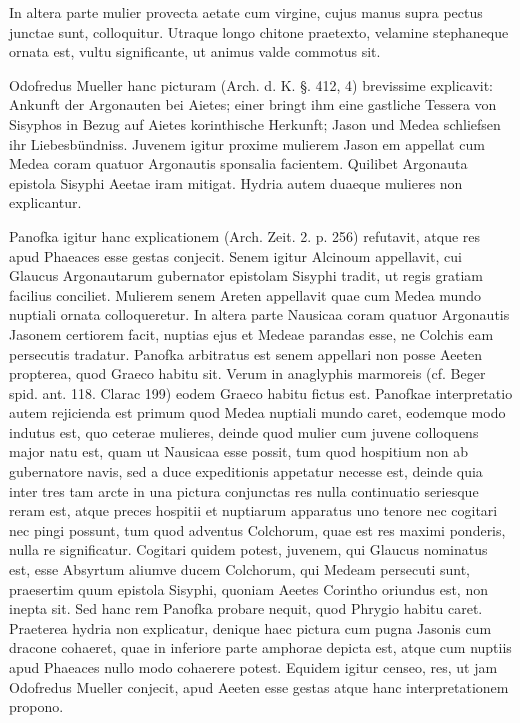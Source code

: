 \documentclass[landscape, a4paper, 11pt, oneside, polutonikogreek, german]{article}
\begin{document}
In altera parte mulier provecta aetate cum virgine, cujus manus supra pectus junctae sunt, colloquitur. Utraque longo chitone praetexto, velamine stephaneque ornata est, vultu significante, ut animus valde commotus sit.

Odofredus Mueller hanc picturam (Arch. d. K. §. 412, 4) brevissime explicavit: Ankunft der Argonauten bei Aietes; einer bringt ihm eine gastliche Tessera von Sisyphos in Bezug auf Aietes korinthische Herkunft; Jason und Medea schliefsen ihr Liebesbündniss. Juvenem igitur proxime mulierem Jason em appellat cum Medea coram quatuor Argonautis sponsalia facientem. Quilibet Argonauta epistola Sisyphi Aeetae iram mitigat. Hydria autem duaeque mulieres non explicantur.

Panofka igitur hanc explicationem (Arch. Zeit. 2. p. 256) refutavit, atque res apud Phaeaces esse gestas conjecit. Senem igitur Alcinoum appellavit, cui Glaucus Argonautarum gubernator epistolam Sisyphi tradit, ut regis gratiam facilius conciliet. Mulierem senem Areten appellavit quae cum Medea mundo nuptiali ornata colloqueretur. In altera parte Nausicaa coram quatuor Argonautis Jasonem certiorem facit, nuptias ejus et Medeae parandas esse, ne Colchis eam persecutis tradatur. Panofka arbitratus est senem appellari non posse Aeeten propterea, quod Graeco habitu sit. Verum in anaglyphis marmoreis (cf. Beger spid. ant. 118. Clarac 199) eodem Graeco habitu fictus est. Panofkae interpretatio autem rejicienda est primum quod Medea nuptiali mundo caret, eodemque modo indutus est, quo ceterae mulieres, deinde quod mulier cum juvene colloquens major natu est, quam ut Nausicaa esse possit, tum quod hospitium non ab gubernatore navis, sed a duce expeditionis appetatur necesse est, deinde quia inter tres tam arcte in una pictura conjunctas res nulla continuatio seriesque reram est, atque preces hospitii et nuptiarum apparatus uno tenore nec cogitari nec pingi possunt, tum quod adventus Colchorum, quae est res maximi ponderis, nulla re significatur. Cogitari quidem potest, juvenem, qui Glaucus nominatus est, esse Absyrtum aliumve ducem Colchorum, qui Medeam persecuti sunt, praesertim quum epistola Sisyphi, quoniam Aeetes Corintho oriundus est, non inepta sit. Sed hanc rem Panofka probare nequit, quod Phrygio habitu caret. Praeterea hydria non explicatur, denique haec pictura cum pugna Jasonis cum dracone cohaeret, quae in inferiore parte amphorae depicta est, atque cum nuptiis apud Phaeaces nullo modo cohaerere potest. Equidem igitur censeo, res, ut jam Odofredus Mueller conjecit, apud Aeeten esse gestas atque hanc interpretationem propono.
\end{document}
